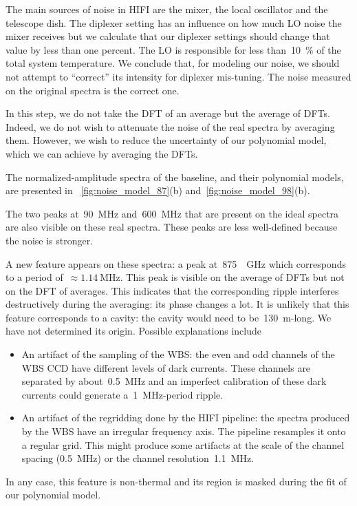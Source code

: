 The main sources of noise in HIFI are the mixer, the local oscillator and the telescope dish.
The diplexer setting has an influence on how much LO noise the mixer receives but we calculate that our diplexer settings should change that value by less than one percent.
The LO is responsible for less than~\SI{10}{\percent} of the total system temperature.
We conclude that, for modeling our noise, we should not attempt to ``correct'' its intensity for diplexer mis-tuning.
The noise measured on the original spectra is the correct one.

In this step, we do not take the DFT of an average but the average of DFTs.
Indeed, we do not wish to attenuate the noise of the real spectra by averaging them.
However, we wish to reduce the uncertainty of our polynomial model, which we can achieve by averaging the DFTs.

The normalized-amplitude spectra of the baseline, and their polynomial models, are presented in~%
\cref{fig:noise_model_87}(b) and~\cref{fig:noise_model_98}(b).

The two peaks at~\SI{90}{\mega\hertz} and~\SI{600}{\mega\hertz} that are present on the ideal spectra are also visible on these real spectra.
These peaks are less well-defined because the noise is stronger.

A new feature appears on these spectra: a peak at~\SI{875}{\per\giga\hertz} which corresponds to a period of~$\approx\SI{1.14}{\mega\hertz}$.
This peak is visible on the average of DFTs but not on the DFT of averages.
This indicates that the corresponding ripple interferes destructively during the averaging: its phase changes a lot.
It is unlikely that this feature corresponds to a cavity: the cavity would need to be~\SI{130}{\meter}-long.
We have not determined its origin.
Possible explanations include
\begin{itemize}
    \item An artifact of the sampling of the WBS:
the even and odd channels of the WBS CCD have different levels of dark currents.
These channels are separated by about~\SI{0.5}{\mega\hertz} and an imperfect calibration of these dark currents could generate a~\SI{1}{\mega\hertz}-period ripple.
    \item An artifact of the regridding done by the HIFI pipeline:
the spectra produced by the WBS have an irregular frequency axis.
The pipeline resamples it onto a regular grid.
This might produce some artifacts at the scale of the channel spacing (\SI{0.5}{\mega\hertz}) or the channel resolution~\SI{1.1}{\mega\hertz}.
\end{itemize}
In any case, this feature is non-thermal and its region is masked during the fit of our polynomial model.

